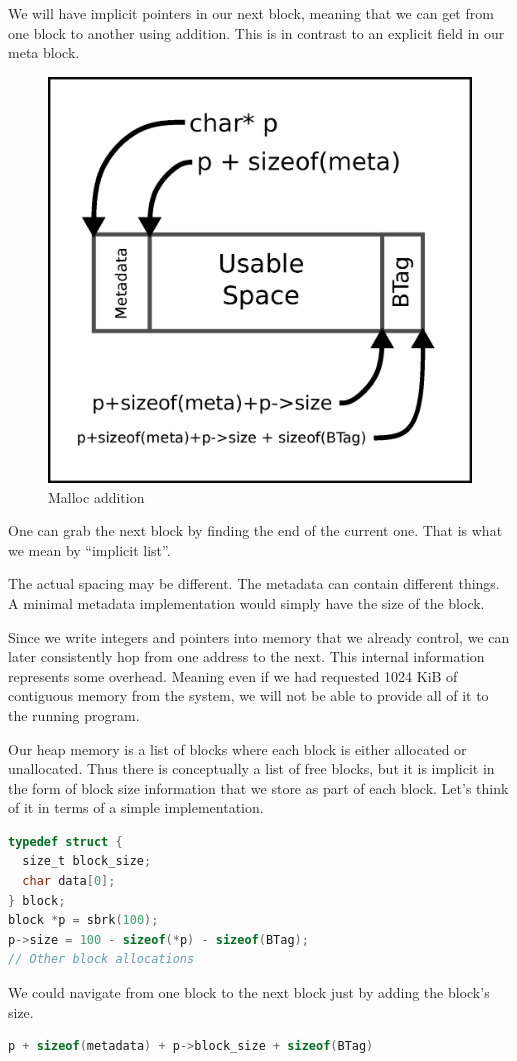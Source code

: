 We will have implicit pointers in our next block, meaning that we can get from one block to another using addition.
This is in contrast to an explicit  field in our meta block.

\begin{figure}[H]
\centering
\includegraphics[width=.5\textwidth]{malloc/drawings/malloc_addition.eps}
\caption{Malloc addition}
\end{figure}

One can grab the next block by finding the end of the current one.
That is what we mean by ``implicit list''.

The actual spacing may be different.
The metadata can contain different things.
A minimal metadata implementation would simply have the size of the block.

Since we write integers and pointers into memory that we already control, we can later consistently hop from one address to the next.
This internal information represents some overhead.
Meaning even if we had requested 1024 KiB of contiguous memory from the system, we will not be able to provide all of it to the running program.

Our heap memory is a list of blocks where each block is either allocated or unallocated.
Thus there is conceptually a list of free blocks, but it is implicit in the form of block size information that we store as part of each block.
Let's think of it in terms of a simple implementation.
\begin{lstlisting}[language=C]
typedef struct {
  size_t block_size;
  char data[0];
} block;
block *p = sbrk(100);
p->size = 100 - sizeof(*p) - sizeof(BTag);
// Other block allocations
\end{lstlisting}

We could navigate from one block to the next block just by adding the block's size.

\begin{lstlisting}[language=C]
p + sizeof(metadata) + p->block_size + sizeof(BTag)
\end{lstlisting}

